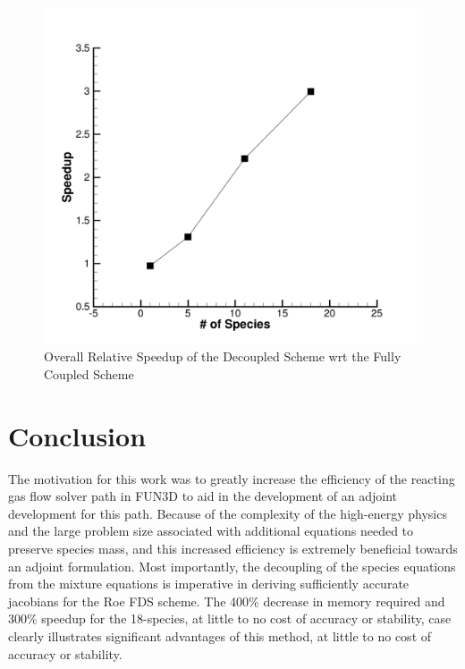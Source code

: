\documentclass[]{aiaa-tc}%
\begin{document}
\begin{figure}
\begin{center}
\includegraphics{total_cost}
\caption{Overall Relative Speedup of the Decoupled Scheme wrt the Fully Coupled Scheme}
\label{overall_speedup}
\end{center}
\end{figure}





\section{Conclusion}

The motivation for this work was to greatly increase the efficiency of the reacting gas flow solver path in FUN3D to aid in the development of an adjoint development for this path.  Because of the complexity of the high-energy physics and the large problem size associated with additional equations needed to preserve species mass, and this increased efficiency is extremely beneficial towards an adjoint formulation.  Most importantly, the decoupling of the species equations from the mixture equations is imperative in deriving sufficiently accurate jacobians for the Roe FDS scheme.  The 400\% decrease in memory required and 300\% speedup for the 18-species, at little to no cost of accuracy or stability, case clearly illustrates significant advantages of this method, at little to no cost of accuracy or stability.
\end{document}
